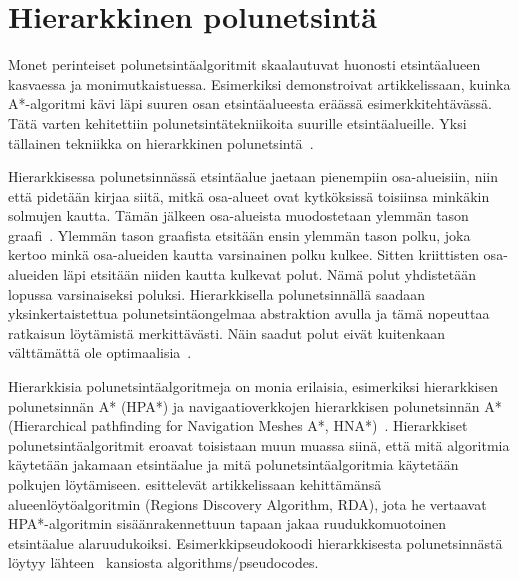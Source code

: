 \section{Hierarkkinen polunetsintä}\label{hpa}
Monet perinteiset polunetsintäalgoritmit skaalautuvat huonosti etsintäalueen 
kasvaessa ja monimutkaistuessa. Esimerkiksi \textcite{rda} demonstroivat 
artikkelissaan, kuinka A*-algoritmi kävi läpi suuren osan etsintäalueesta 
eräässä esimerkkitehtävässä. Tätä varten kehitettiin polunetsintätekniikoita 
suurille etsintäalueille. Yksi tällainen tekniikka on hierarkkinen 
polunetsintä~\cite{rda}. \par
	Hierarkkisessa polunetsinnässä etsintäalue jaetaan pienempiin 
osa-alueisiin, niin että pidetään kirjaa siitä, mitkä osa-alueet ovat 
kytköksissä toisiinsa minkäkin solmujen kautta. Tämän jälkeen 
osa-alueista muodostetaan ylemmän tason graafi~\cite{rda}. Ylemmän tason 
graafista etsitään ensin ylemmän tason polku, joka kertoo minkä 
osa-alueiden kautta varsinainen polku kulkee. Sitten kriittisten osa-alueiden 
läpi etsitään niiden kautta kulkevat polut. Nämä polut yhdistetään lopussa 
varsinaiseksi poluksi. Hierarkkisella polunetsinnällä saadaan 
yksinkertaistettua polunetsintäongelmaa abstraktion avulla ja tämä nopeuttaa 
ratkaisun löytämistä merkittävästi. Näin saadut polut eivät kuitenkaan 
välttämättä ole optimaalisia~\cite{rda}.\par
	Hierarkkisia polunetsintäalgoritmeja on monia erilaisia, esimerkiksi 
hierarkkisen polunetsinnän A* (HPA*) ja navigaatioverkkojen hierarkkisen 
polunetsinnän A* (Hierarchical pathfinding for Navigation Meshes A*, 
HNA*)~\cite{rda}. Hierarkkiset po\-lun\-etsintäalgoritmit eroavat toisistaan 
muun muassa siinä, että mitä algoritmia käytetään jakamaan etsintäalue ja mitä 
polunetsintäalgoritmia käytetään polkujen löytämiseen. \textcite{rda} 
esittelevät artikkelissaan kehittämänsä alueenlöytöalgoritmin (Regions 
Discovery Algorithm, RDA), jota he vertaavat HPA*-algoritmin 
sisäänrakennettuun tapaan jakaa ruudukkomuotoinen etsintäalue 
ala\-ruu\-dukoiksi. Esimerkkipseudokoodi hierarkkisesta polunetsinnästä löytyy 
lähteen~\cite{gt2} kansiosta algorithms/pseudocodes.
